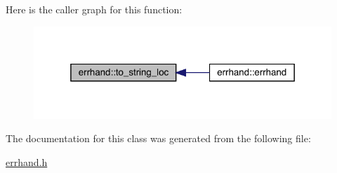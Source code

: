 Here is the caller graph for this function\+:\nopagebreak
\begin{figure}[H]
\begin{center}
\leavevmode
\includegraphics[width=319pt]{classerrhand_a930df1c197154853159683cb2ad55369_icgraph}
\end{center}
\end{figure}


The documentation for this class was generated from the following file\+:\begin{DoxyCompactItemize}
\item 
\mbox{\hyperlink{errhand_8h}{errhand.\+h}}\end{DoxyCompactItemize}
